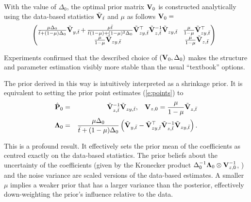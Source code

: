 With the value of $\Delta_{0}$, the optimal prior matrix $\mathbf{V}_{0}$ is constructed analytically using the data-based statistics $\tilde{\mathbf{V}}_{\bar{t}}$ and $\mu$ as follows $\mathbf{V}_{0}= $
\begin{equation*}
\hspace*{-1.5ex}
\begin{pmatrix}
\frac{\mu \Delta_{0}}{\bar{t}+(1-\mu)\Delta_{0}}\tilde{\mathbf{V}}_{y,\bar{t}}\hspace*{-0.2ex}+\hspace*{-0.2ex} \frac{\mu\bar{t}}{\bar{t}(1-\mu) + (1-\mu)^2\Delta_{0}} \tilde{\mathbf{V}}_{zy,\bar{t}}^{\top} \tilde{\mathbf{V}}_{z,\bar{t}}^{-1} \tilde{\mathbf{V}}_{zy,\bar{t}} &\hspace*{-0.5ex}\frac{\mu}{1-\mu}\tilde{\mathbf{V}}_{zy,\bar{t}}^{\top} \\
\frac{\mu}{1-\mu} \tilde{\mathbf{V}}_{zy,\bar{t}} &\hspace*{-0.5ex}\frac{\mu}{1-\mu} \tilde{\mathbf{V}}_{z,\bar{t}}
\end{pmatrix}
\end{equation*}

Experiments confirmed that the described choice of $(\mathbf{V}_{0}, \Delta_{0})$ makes the structure and parameter estimation visibly more stable than the usual ``textbook'' options.

The prior derived in this way is intuitively interpreted as a shrinkage prior. It is equivalent to setting the prior point estimates (\ref{e:points}) to
\begin{eqnarray}
\nonumber
\hat{\mathbf{P}}_{0} &=&\tilde{\mathbf{V}}_{z,\bar{t}}^{-1}\tilde{\mathbf{V}}_{zy,\bar{t}},\hspace*{2ex}
\mathbf{V}_{z,0}=\frac{\mu}{1-\mu}\tilde{\mathbf{V}}_{z,\bar{t}}
\\
\nonumber
\mathbf{\Lambda}_{0} &=&\frac{\mu\Delta_{0}}{\bar{t} + (1-\mu)\Delta_{0}}\left(\tilde{\mathbf{V}}_{y,\bar{t}} - \tilde{\mathbf{V}}_{zy,\bar{t}}^{\top}\tilde{\mathbf{V}}_{z,\bar{t}}^{-1}\tilde{\mathbf{V}}_{zy,\bar{t}}\right).
\end{eqnarray}

This is a profound result. It effectively sets the prior mean of the coefficients as centred exactly on the data-based statistics. The prior beliefs about the uncertainty of the coefficients (given by the Kronecker product $\Delta^{-1}_{0}\mathbf{\Lambda}_{0}\otimes \mathbf{V}_{z,0}^{-1}$, \cite{Pet:81}) and the noise variance are scaled versions of the data-based estimates. A smaller $\mu$ implies a weaker prior that has a larger variance than the posterior, effectively down-weighting the prior's influence relative to the data.

